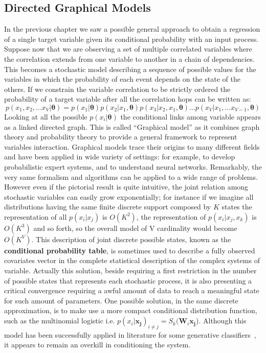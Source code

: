 \subsection{Directed Graphical Models}
In the previous chapter we saw a possible general approach to obtain a regression of a single target variable given its conditional probability with an input process. Suppose now that we are observing a set of multiple correlated variables where the correlation extends from one variable to another in a chain of dependencies. This becomes a stochastic model describing a sequence of possible values for the variables in which the probability of each event depends on the state of the others.
If we constrain the variable correlation to be strictly ordered the probability of a target variable after all the correlation hops can be written as:
\begin{equation}
    p(x_1, x_2, ... x_V | \bm{\theta}) = p(x_1|\bm{\theta})p(x_2|x_1,\bm{\theta})p(x_3|x_2,x_1,\bm{\theta}) ... p(x_V|x_1, ... x_{V-1},\bm{\theta})
\end{equation}
Looking at all the possible $p(x_i|\bm{\theta})$ the conditional links among variable appears as a linked directed graph.
%
This is called “Graphical model” as it combines graph theory and probability theory to provide a general framework to represent variables interaction. Graphical models trace their origins to many different fields and have been applied in wide variety of settings: for example, to develop probabilistic expert systems, and to understand neural networks. Remarkably, the very same formalism and algorithms can be applied to a wide range of problems.
%
However even if the pictorial result is quite intuitive, the joint relation among stochastic variables can easily grow exponentially; for instance if we imagine all distributions having the same finite discrete support composed by $K$ states the representation of all $p(x_i|x_j)$ is $O(K^2)$, the representation of $p(x_i|x_j,x_k)$ is $O(K^3)$ and so forth, so the overall model of V cardinality would become $O(K^V)$. This description of joint discrete possible states, known as the \textbf{conditional probability table}, is sometimes used to describe a fully observed covariates vector in the complete statistical description of the complex systems of variable. Actually this solution, beside requiring a first restriction in the number of possible states that represents each stochastic process, it is also presenting a critical convergence requiring a awful amount of data to reach a meaningful state for such amount of parameters.
One possible solution, in the same discrete approximation, is to make use a more compact conditional distribution function, such as the multinomial logistic i.e. $p(x_i | \bm{x_j})_{i \neq j} = S_k(\bm{W}_i \bm{x_{j}}$). Although this model has been successfully applied in literature for some generative classifiers~\cite{Bengio:1999:MHD:3009657.3009714}, it appears to remain an overkill in conditioning the system.

